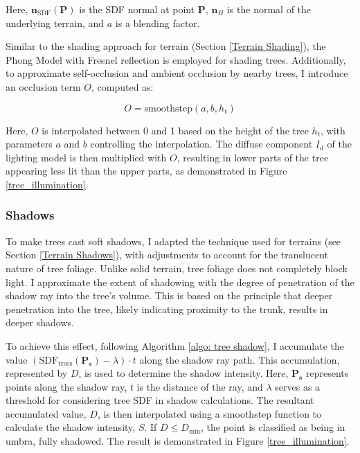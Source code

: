 Here, $\mathbf{n}_{\text{SDF}}(\mathbf{P})$ is the SDF normal at point $\mathbf{P}$, $\mathbf{n}_H$ is the normal of the underlying terrain, and $a$ is a blending factor.

Similar to the shading approach for terrain (Section \ref{Terrain Shading}), the Phong Model with Fresnel reflection is employed for shading trees. Additionally, to approximate self-occlusion and ambient occlusion by nearby trees, I introduce an occlusion term $O$, computed as:

\begin{equation}
O = \text{smoothstep}(a, b, h_t)
\end{equation}

Here, $O$ is interpolated between 0 and 1 based on the height of the tree $h_t$, with parameters $a$ and $b$ controlling the interpolation. The diffuse component $I_d$ of the lighting model is then multiplied with $O$, resulting in lower parts of the tree appearing less lit than the upper parts, as demonstrated in Figure \ref{tree_illumination}.

\subsubsection{Shadows}

To make trees cast soft shadows, I adapted the technique used for terrains (see Section \ref{Terrain Shadows}), with adjustments to account for the translucent nature of tree foliage. Unlike solid terrain, tree foliage does not completely block light. I approximate the extent of shadowing with the degree of penetration of the shadow ray into the tree's volume. This is based on the principle that deeper penetration into the tree, likely indicating proximity to the trunk, results in deeper shadows.

To achieve this effect, following Algorithm \ref{algo: tree shadow}, I accumulate the value $(\text{SDF}_{\text{trees}}(\mathbf{P_s}) - \lambda) \cdot t$ along the shadow ray path. This accumulation, represented by $D$, is used to determine the shadow intensity. Here, $\mathbf{P_s}$ represents points along the shadow ray, $t$ is the distance of the ray, and $\lambda$ serves as a threshold for considering tree SDF in shadow calculations. The resultant accumulated value, $D$, is then interpolated using a smoothstep function to calculate the shadow intensity, $S$. If $D \le D_{\text{min}}$, the point is classified as being in umbra, fully shadowed. The result is demonstrated in Figure \ref{tree_illumination}.

